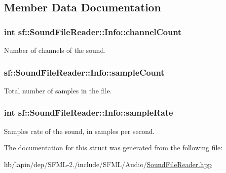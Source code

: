\subsection{Member Data Documentation}
\hypertarget{structsf_1_1_sound_file_reader_1_1_info_ac748bb30768d1a3caf329e95d31d6d2a}{
\subsubsection[{channel\-Count}]{ {\bf int} sf\-::\-Sound\-File\-Reader\-::\-Info\-::channel\-Count}}\label{structsf_1_1_sound_file_reader_1_1_info_ac748bb30768d1a3caf329e95d31d6d2a}


Number of channels of the sound. 

\hypertarget{structsf_1_1_sound_file_reader_1_1_info_a74b40b4693d7000571484736d1367167}{
\subsubsection[{sample\-Count}]{ sf\-::\-Sound\-File\-Reader\-::\-Info\-::sample\-Count}}\label{structsf_1_1_sound_file_reader_1_1_info_a74b40b4693d7000571484736d1367167}


Total number of samples in the file. 

\hypertarget{structsf_1_1_sound_file_reader_1_1_info_a06ef71c19e7de190b294ae02c361f752}{
\subsubsection[{sample\-Rate}]{ {\bf int} sf\-::\-Sound\-File\-Reader\-::\-Info\-::sample\-Rate}}\label{structsf_1_1_sound_file_reader_1_1_info_a06ef71c19e7de190b294ae02c361f752}


Samples rate of the sound, in samples per second. 



The documentation for this struct was generated from the following file\-:\begin{DoxyCompactItemize}
\item 
lib/lapin/dep/\-S\-F\-M\-L-\/2./include/\-S\-F\-M\-L/\-Audio/\hyperlink{lapin_2dep_2_s_f_m_l-2_83_2include_2_s_f_m_l_2_audio_2_sound_file_reader_8hpp}{Sound\-File\-Reader.\-hpp}\end{DoxyCompactItemize}
